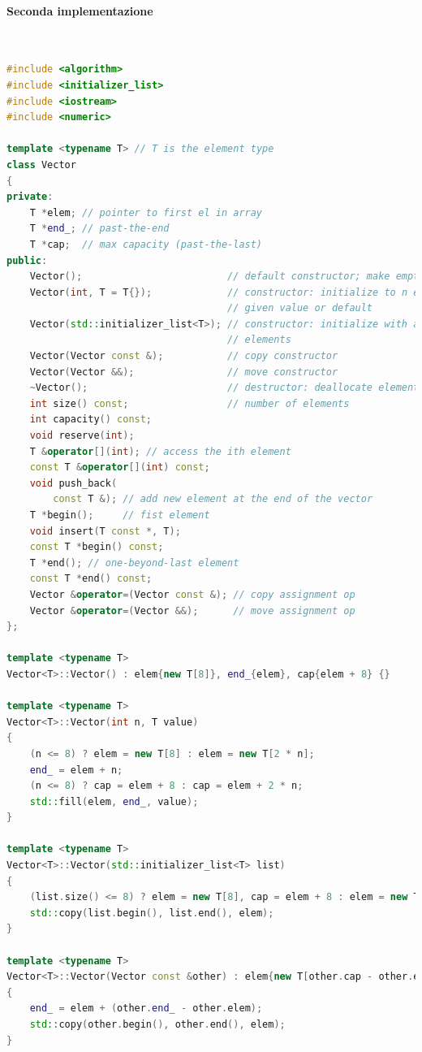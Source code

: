 \documentclass[10pt, oneside]{book}
\begin{document}
\paragraph{Seconda implementazione}\,\\
\begin{lstlisting}[language=C++]
#include <algorithm>
#include <initializer_list>
#include <iostream>
#include <numeric>

template <typename T> // T is the element type
class Vector
{
private:
    T *elem; // pointer to first el in array
    T *end_; // past-the-end
    T *cap;  // max capacity (past-the-last)
public:
    Vector();                         // default constructor; make empty vector
    Vector(int, T = T{});             // constructor: initialize to n elements at
                                      // given value or default
    Vector(std::initializer_list<T>); // constructor: initialize with a list of
                                      // elements
    Vector(Vector const &);           // copy constructor
    Vector(Vector &&);                // move constructor
    ~Vector();                        // destructor: deallocate elements
    int size() const;                 // number of elements
    int capacity() const;
    void reserve(int);
    T &operator[](int); // access the ith element
    const T &operator[](int) const;
    void push_back(
        const T &); // add new element at the end of the vector
    T *begin();     // fist element
    void insert(T const *, T);
    const T *begin() const;
    T *end(); // one-beyond-last element
    const T *end() const;
    Vector &operator=(Vector const &); // copy assignment op
    Vector &operator=(Vector &&);      // move assignment op
};

template <typename T>
Vector<T>::Vector() : elem{new T[8]}, end_{elem}, cap{elem + 8} {}

template <typename T>
Vector<T>::Vector(int n, T value)
{
    (n <= 8) ? elem = new T[8] : elem = new T[2 * n];
    end_ = elem + n;
    (n <= 8) ? cap = elem + 8 : cap = elem + 2 * n;
    std::fill(elem, end_, value);
}

template <typename T>
Vector<T>::Vector(std::initializer_list<T> list)
{
    (list.size() <= 8) ? elem = new T[8], cap = elem + 8 : elem = new T[2 * list.size()], cap = elem + 2 * list.size();
    std::copy(list.begin(), list.end(), elem);
}

template <typename T>
Vector<T>::Vector(Vector const &other) : elem{new T[other.cap - other.elem]}, cap{elem + (other.cap - other.elem)}
{
    end_ = elem + (other.end_ - other.elem);
    std::copy(other.begin(), other.end(), elem);
}


\end{lstlisting}
\end{document}
